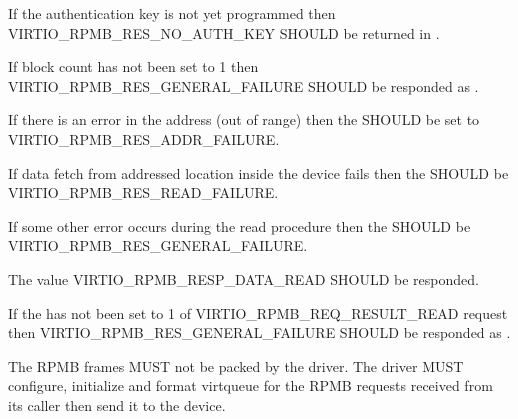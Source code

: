 If the authentication key is not yet programmed then VIRTIO_RPMB_RES_NO_AUTH_KEY
SHOULD be returned in .

If block count has not been set to 1 then VIRTIO_RPMB_RES_GENERAL_FAILURE SHOULD be
responded as .

If there is an error in the address (out of range) then the  SHOULD
be set to VIRTIO_RPMB_RES_ADDR_FAILURE.

If data fetch from addressed location inside the device fails then the 
SHOULD be VIRTIO_RPMB_RES_READ_FAILURE.

If some other error occurs during the read procedure then the 
SHOULD be VIRTIO_RPMB_RES_GENERAL_FAILURE.

The  value VIRTIO_RPMB_RESP_DATA_READ SHOULD be responded.


If the  has not been set to 1 of VIRTIO_RPMB_REQ_RESULT_READ
request then VIRTIO_RPMB_RES_GENERAL_FAILURE SHOULD be responded as .


The RPMB frames MUST not be packed by the driver.
The driver MUST configure, initialize and format virtqueue for the RPMB requests received from its caller then send it to the device.


